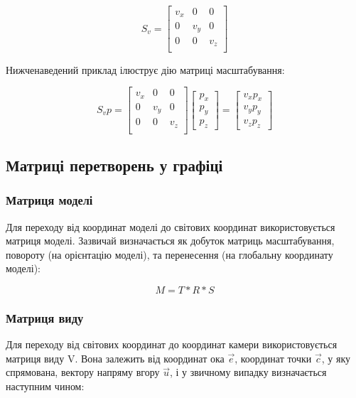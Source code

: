 \begin{equation}
  S_v = \begin{bmatrix}
    v_x & 0 & 0  \\
    0 & v_y & 0  \\
    0 & 0 & v_z  \\
  \end{bmatrix}
\end{equation}

Нижченаведений приклад ілюструє дію матриці масштабування:

\begin{equation}
  S_vp =
  \begin{bmatrix}
    v_x & 0 & 0  \\
    0 & v_y & 0  \\
    0 & 0 & v_z  \\
  \end{bmatrix}
  \begin{bmatrix}
    p_x \\ p_y \\ p_z
  \end{bmatrix}
  =
  \begin{bmatrix}
    v_xp_x \\ v_yp_y \\ v_zp_z
  \end{bmatrix}
\end{equation}

\subsection{Матриці перетворень у графіці}

\subsubsection{Матриця моделі}

Для переходу від координат моделі до світових координат використовується матриця моделі. Зазвичай визначається як добуток матриць масштабування, повороту (на орієнтацію моделі), та перенесення (на глобальну координату моделі):

\begin{equation}
  M = T * R * S
\end{equation}

\subsubsection{Матриця виду}

Для переходу від світових координат до координат камери використовується матриця виду V. Вона залежить від координат ока $\vec e$, координат точки $\vec c$, у яку спрямована, вектору напряму вгору $\vec u$, і у звичному випадку визначається наступним чином:

